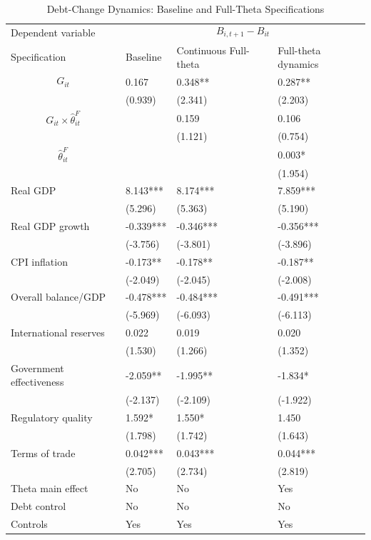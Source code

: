 \begin{table}[H]\centering
\begin{threeparttable}
\caption{Debt-Change Dynamics: Baseline and Full-Theta Specifications}
\label{tab:debt_change_combined_fulltheta}
\scriptsize
\begin{tabularx}{\textwidth}{lYYY}
\toprule
Dependent variable &  \\
\cmidrule(lr){2-4}
Specification & Baseline & Continuous Full-theta & Full-theta dynamics \\
\midrule
$$G_{it}$$ & 0.167 & 0.348** & 0.287** \\
 & (0.939) & (2.341) & (2.203) \\
$$G_{it}\times\widehat{\theta}^{F}_{it}$$ &  & 0.159 & 0.106 \\
 &  & (1.121) & (0.754) \\
$$\widehat{\theta}^{F}_{it}$$ &  &  & 0.003* \\
 &  &  & (1.954) \\
Real GDP & 8.143*** & 8.174*** & 7.859*** \\
 & (5.296) & (5.363) & (5.190) \\
Real GDP growth & -0.339*** & -0.346*** & -0.356*** \\
 & (-3.756) & (-3.801) & (-3.896) \\
CPI inflation & -0.173** & -0.178** & -0.187** \\
 & (-2.049) & (-2.045) & (-2.008) \\
Overall balance/GDP & -0.478*** & -0.484*** & -0.491*** \\
 & (-5.969) & (-6.093) & (-6.113) \\
International reserves & 0.022 & 0.019 & 0.020 \\
 & (1.530) & (1.266) & (1.352) \\
Government effectiveness & -2.059** & -1.995** & -1.834* \\
 & (-2.137) & (-2.109) & (-1.922) \\
Regulatory quality & 1.592* & 1.550* & 1.450 \\
 & (1.798) & (1.742) & (1.643) \\
Terms of trade & 0.042*** & 0.043*** & 0.044*** \\
 & (2.705) & (2.734) & (2.819) \\
\midrule
Theta main effect & No & No & Yes \\
Debt control & No & No & No \\
Controls & Yes & Yes & Yes \\

\end{tabularx}
\end{threeparttable}
\end{table}
